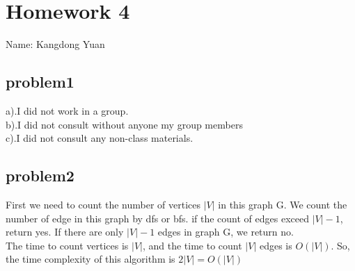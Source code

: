 \documentclass[11pt]{article}
\begin{document}
\section{Homework 4}
Name: Kangdong Yuan
	
\subsection{problem1}
a).I did not work in a group.
\\b).I did not consult without anyone my group members
\\c).I did not consult any non-class materials.

\subsection{problem2}
First we need to count the number of vertices $|V|$ in this graph G. We count the number of edge in this graph by dfs or bfs. if the count of edges exceed $|V|-1$, return yes. If there are only $|V|-1$ edges in graph G, we return no.  \\
The time to count vertices is $|V|$, and the time to count $|V|$ edges is $O(|V|)$. So, the time complexity of this algorithm is $2|V|=O(|V|)$ 
\end{document}
